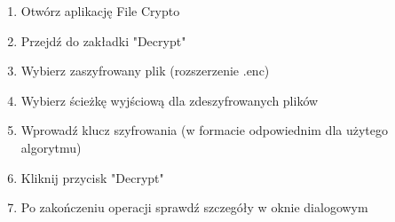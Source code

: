 \documentclass[12pt,a4paper]{article}
\begin{document}
\begin{enumerate}
\item Otwórz aplikację File Crypto
\item Przejdź do zakładki "Decrypt"
\item Wybierz zaszyfrowany plik (rozszerzenie .enc)
\item Wybierz ścieżkę wyjściową dla zdeszyfrowanych plików
\item Wprowadź klucz szyfrowania (w formacie odpowiednim dla użytego algorytmu)
\item Kliknij przycisk "Decrypt"
\item Po zakończeniu operacji sprawdź szczegóły w oknie dialogowym
\end{enumerate}
\end{document}
